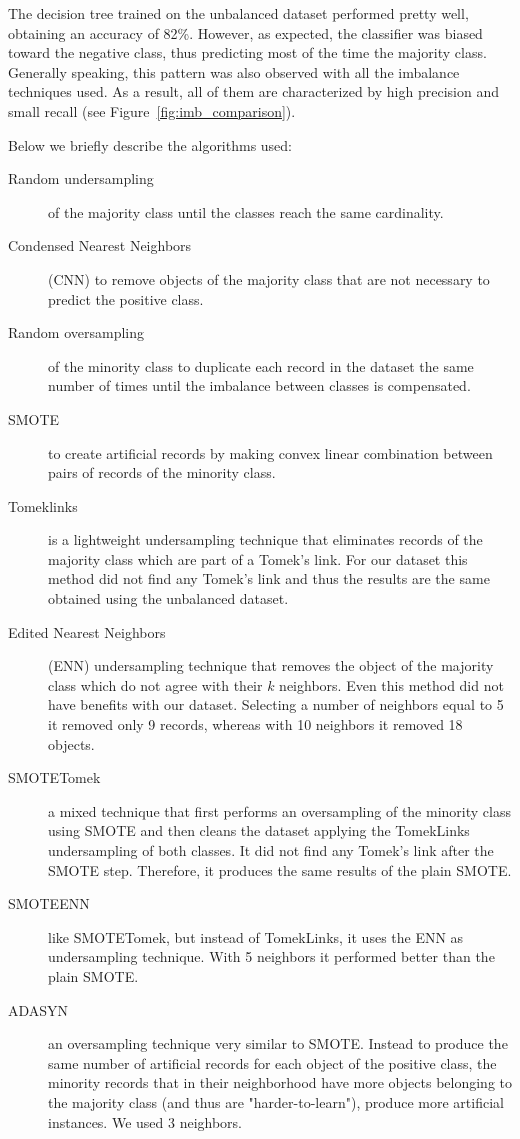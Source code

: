 \documentclass[10pt, a4paper, twocolumn]{article}
\begin{document}
The decision tree trained on the unbalanced dataset performed pretty well, obtaining an accuracy of 82\%. However, as expected, the classifier was biased toward the negative class, thus predicting most of the time the majority class. Generally speaking, this pattern was also observed with all the imbalance techniques used. As a result, all of them are characterized by high precision and small recall (see Figure~\ref{fig:imb_comparison}).

Below we briefly describe the algorithms used:
%
\begin{description}
\item [Random undersampling] of the majority class until the classes reach the same cardinality. 
\item [Condensed Nearest Neighbors] (CNN) to remove objects of the majority class that are not necessary to predict the positive class. 
\item [Random oversampling] of the minority class to duplicate each record in the dataset the same number of times until the imbalance between classes is compensated.
\item [SMOTE] to create artificial records by making convex linear combination between pairs of records of the minority class.
\item [Tomeklinks] is a lightweight undersampling technique that eliminates records of the majority class which are part of a Tomek's link. For our dataset this method did not find any Tomek's link and thus the results are the same obtained using the unbalanced dataset.
\item [Edited Nearest Neighbors] (ENN) undersampling technique that removes the object of the majority class which do not agree with their $k$ neighbors. Even this method did not have benefits with our dataset. Selecting a number of neighbors equal to 5 it removed only 9 records, whereas with 10 neighbors it removed 18 objects.
\item [SMOTETomek] a mixed technique that first performs an oversampling of the minority class using SMOTE and then cleans the dataset applying the TomekLinks undersampling of both classes. It did not find any Tomek's link after the SMOTE step. Therefore, it produces the same results of the plain SMOTE.
\item [SMOTEENN] like SMOTETomek, but instead of TomekLinks, it uses the ENN as undersampling technique. With 5 neighbors it performed better than the plain SMOTE. 
\item [ADASYN] an oversampling technique very similar to SMOTE. Instead to produce the same number of artificial records for each object of the positive class, the minority records that in their neighborhood have more objects belonging to the majority class (and thus are "harder-to-learn"), produce more artificial instances. We used 3 neighbors.

\end{description}
\end{document}
